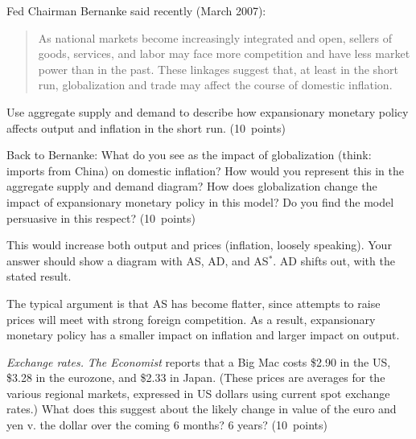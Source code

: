 \documentclass[letterpaper,12pt]{exam}
\begin{document}
\begin{questions}
Fed Chairman Bernanke said recently (March 2007):
\begin{quote}
As national markets become increasingly integrated and open, sellers of goods, services, and labor may face more competition and have less market power than in the past.
These linkages suggest that, at least in the short run, globalization and trade
may affect the course of domestic inflation.
\end{quote}
%
\begin{parts}
\item Use aggregate supply and demand to
describe how expansionary monetary policy
affects output and inflation in the short run.
(10~points)

\item Back to Bernanke:
What do you see as the impact of globalization
(think: imports from China)
on domestic inflation?
How would you represent this
in the aggregate supply and demand diagram?
How does globalization change the impact of expansionary monetary
policy in this model?
Do you find the model persuasive in this respect?
(10~points)
\end{parts}


\begin{solution}
\begin{parts}
\item This would increase both output and prices (inflation,
loosely speaking).  Your answer should show a diagram with
AS, AD, and AS$^*$.
AD shifts out, with the stated result.

\item The typical argument is that AS has become flatter,
since attempts to raise prices will meet with strong foreign competition.
As a result, expansionary monetary policy has a
smaller impact on inflation and larger impact on output.
\end{parts}
\end{solution}



\begin{parts}
\item {\it Exchange rates.\/}
{\it The Economist\/} reports that a Big Mac costs \$2.90 in the US, \$3.28 in the eurozone,
and \$2.33 in Japan.  (These prices are averages for the various regional markets, expressed in US
dollars using current spot exchange rates.)  What does this suggest about the likely change in
value of the euro and yen v. the dollar over the coming 6 months?  6 years? (10~points)


\end{parts}
\end{questions}
\end{document}
